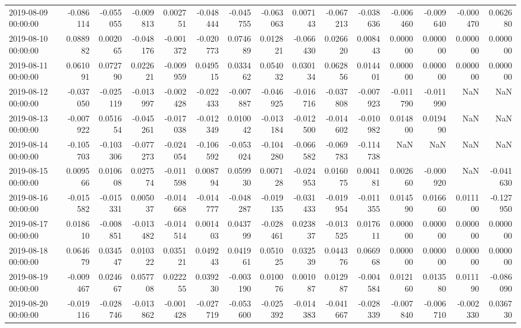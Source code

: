 \begin{tabular}{lrrrrrrrrrrrrrr}
2019-08-09 00:00:00 & -0.086114 & -0.055055 & -0.009813 & 0.002751 & -0.048444 & -0.045755 & -0.063063 & 0.007143 & -0.067213 & -0.038636 & -0.006460 & -0.009640 & -0.000470 & 0.062680 \\
2019-08-10 00:00:00 & 0.088982 & 0.002065 & -0.048176 & -0.001372 & -0.020773 & 0.074689 & 0.012821 & -0.066430 & 0.026620 & 0.008443 & 0.000000 & 0.000000 & 0.000000 & 0.000000 \\
2019-08-11 00:00:00 & 0.061091 & 0.072790 & 0.022621 & -0.009959 & 0.049515 & 0.033462 & 0.054032 & 0.030134 & 0.062856 & 0.014401 & 0.000000 & 0.000000 & 0.000000 & 0.000000 \\
2019-08-12 00:00:00 & -0.037050 & -0.025119 & -0.013997 & -0.002428 & -0.022433 & -0.007887 & -0.046925 & -0.016716 & -0.037808 & -0.007923 & -0.011790 & -0.011990 & NaN & NaN \\
2019-08-13 00:00:00 & -0.007922 & 0.051654 & -0.045261 & -0.017038 & -0.012349 & 0.010042 & -0.013184 & -0.012500 & -0.014602 & -0.010982 & 0.014800 & 0.019490 & NaN & NaN \\
2019-08-14 00:00:00 & -0.105703 & -0.103306 & -0.077273 & -0.024054 & -0.106592 & -0.053024 & -0.104280 & -0.066582 & -0.069783 & -0.114738 & NaN & NaN & NaN & NaN \\
2019-08-15 00:00:00 & 0.009566 & 0.010608 & 0.027574 & -0.011598 & 0.008794 & 0.059930 & 0.007128 & -0.024953 & 0.016075 & 0.004181 & 0.002660 & -0.000920 & NaN & -0.041630 \\
2019-08-16 00:00:00 & -0.015582 & -0.015331 & 0.005037 & -0.014668 & -0.014777 & -0.048287 & -0.019135 & -0.031433 & -0.019954 & -0.011355 & 0.014590 & 0.016660 & 0.011100 & -0.127950 \\
2019-08-17 00:00:00 & 0.018610 & -0.008851 & -0.013482 & -0.014514 & 0.001403 & 0.043799 & -0.028461 & 0.023837 & -0.013525 & 0.017611 & 0.000000 & 0.000000 & 0.000000 & 0.000000 \\
2019-08-18 00:00:00 & 0.064679 & 0.034547 & 0.010322 & 0.035121 & 0.049243 & 0.041961 & 0.051025 & 0.032539 & 0.044376 & 0.066968 & 0.000000 & 0.000000 & 0.000000 & 0.000000 \\
2019-08-19 00:00:00 & -0.009467 & 0.024667 & 0.057708 & 0.022255 & 0.039230 & -0.003190 & 0.010076 & 0.001087 & 0.012987 & -0.004584 & 0.012160 & 0.013580 & 0.011190 & -0.086090 \\
2019-08-20 00:00:00 & -0.019116 & -0.028746 & -0.013862 & -0.001428 & -0.027719 & -0.053600 & -0.025392 & -0.014383 & -0.041667 & -0.028339 & -0.007840 & -0.006710 & -0.002330 & 0.036730 \\

\end{tabular}
